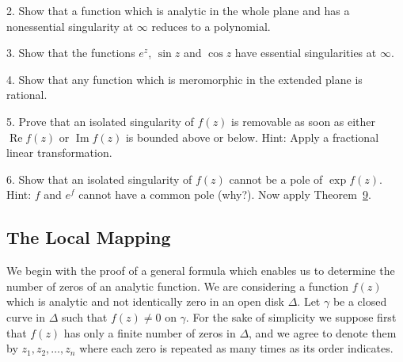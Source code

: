 2. Show that a function which is analytic in the whole plane and has a nonessential singularity at $\infty$ reduces to a polynomial.

3. Show that the functions $e^{z}$, $\sin z$ and $\cos z$ have essential singularities at $\infty$.

4. Show that any function which is meromorphic in the extended plane is rational.

5. Prove that an isolated singularity of $f(z)$ is removable as soon as either $\operatorname{Re} f(z)$ or $\operatorname{Im} f(z)$ is bounded above or below. Hint: Apply a fractional linear transformation.

6. Show that an isolated singularity of $f(z)$ cannot be a pole of $\exp f(z)$. Hint: $f$ and $e^f$ cannot have a common pole (why?). Now apply Theorem~\hyperref[thm:4.9]{9}.

\setcounter{section}{3}\setcounter{subsection}{2}\subsection{The Local Mapping}\label{sec:4.3.3}
We begin with the proof of a general formula which enables us to determine the number of zeros of an analytic function. We are considering a function $f(z)$ which is analytic and not identically zero in an open disk $\Delta$. Let $\gamma$ be a closed curve in $\Delta$ such that $f(z) \neq 0$ on $\gamma$. For the sake of simplicity we suppose first that $f(z)$ has only a finite number of zeros in $\Delta$, and we agree to denote them by $z_1, z_2, \ldots, z_n$ where each zero is repeated as many times as its order indicates.

